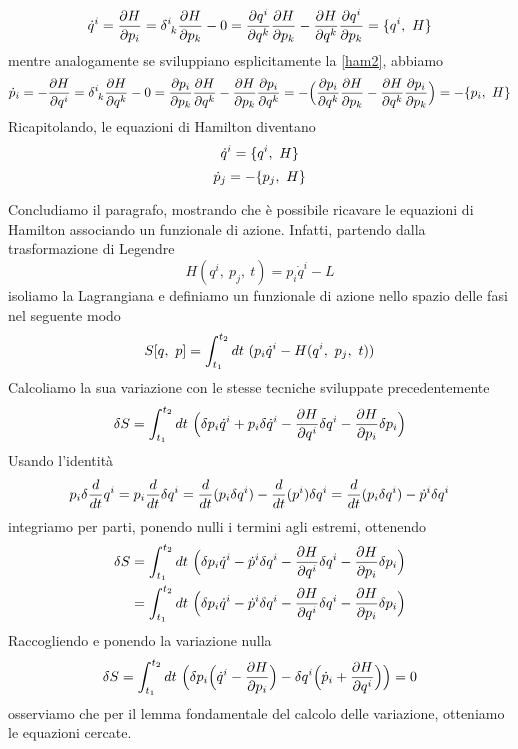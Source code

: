 \begin{equation*}
    \dot q^i = \pdv{H}{p_i} = \delta^i_{\phantom i k} \pdv{H}{p_k} - 0 = \pdv{q^i}{q^k} \pdv{H}{p_k} - \pdv{H}{q^k} \pdv{q^i}{p_k} = \poi{q^i}{H}
\end{equation*}
    mentre analogamente se sviluppiano esplicitamente la \eqref{ham2}, abbiamo
\begin{equation*}
    \dot p_i = - \pdv{H}{q^i} = \delta^i_{\phantom i k} \pdv{H}{q^k} - 0 = \pdv{p_i}{p_k} \pdv{H}{q^k} - \pdv{H}{p_k} \pdv{p_i}{q^k} = - \Big( \pdv{p_i}{q^k} \pdv{H}{p_k} - \pdv{H}{q^k} \pdv{p_i}{p_k} \Big) = - \poi{p_i}{H}
\end{equation*}
    Ricapitolando, le equazioni di Hamilton diventano 
\begin{equation}
    \dot q^i = \{q^i, ~H\}
\end{equation}
\begin{equation}
    \dot p_j = - \{p_j, ~H\}
\end{equation}  

    Concludiamo il paragrafo, mostrando che è possibile ricavare le equazioni di Hamilton associando un funzionale di azione. Infatti, partendo dalla trasformazione di Legendre
\begin{equation*}
    H(q^i, ~p_j, ~t) = p_i \dot q^i - L
\end{equation*}
    isoliamo la Lagrangiana e definiamo un funzionale di azione nello spazio delle fasi nel seguente modo 
\begin{equation*}
    S[q, ~p] = \int_{t_1}^{t_2}dt~ (p_i \dot q^i - H(q^i, ~p_j, ~t))
\end{equation*}
    Calcoliamo la sua variazione con le stesse tecniche sviluppate precedentemente
\begin{equation*}
    \delta S = \int_{t_1}^{t_2}dt~ \Big ( \delta p_i \dot q^i + p_i \delta \dot q^i - \frac{\partial H}{\partial q^i} \delta q^i - \frac{\partial H}{\partial p_i} \delta p_i \Big )
\end{equation*}
    Usando l'identità 
\begin{equation*}
    p_i \delta \frac{d}{dt} q^i = p_i \frac{d}{dt} \delta q^i = \frac{d}{dt} (p_i \delta q^i) - \frac{d}{dt} (p^i) \delta q^i = \frac{d}{dt} (p_i \delta q^i) - \dot p^i \delta q^i
\end{equation*}
    integriamo per parti, ponendo nulli i termini agli estremi, ottenendo
\begin{equation*}
\begin{aligned}
    \delta S & = \int_{t_1}^{t_2}dt~ \Big ( \delta p_i \dot q^i - \dot p^i \delta q^i - \frac{\partial H}{\partial q^i} \delta q^i - \frac{\partial H}{\partial p_i} \delta p_i \Big) \\ &= \int_{t_1}^{t_2}dt~ \Big ( \delta p_i \dot q^i - \dot p^i \delta q^i - \frac{\partial H}{\partial q^i} \delta q^i - \frac{\partial H}{\partial p_i} \delta p_i \Big) 
\end{aligned}
\end{equation*}
    Raccogliendo e ponendo la variazione nulla
\begin{equation*}
    \delta S = \int_{t_1}^{t_2}dt~ \Big ( \delta p_i \Big( \dot q^i - \frac{\partial H}{\partial p_i} \Big ) - \delta q^i \Big(\dot p_i + \frac{\partial H}{\partial q^i} \Big ) \Big) = 0
\end{equation*} 
    osserviamo che per il lemma fondamentale del calcolo delle variazione, otteniamo le equazioni cercate. 

